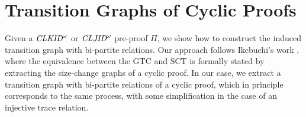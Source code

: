 \section{Transition Graphs of Cyclic Proofs}
\label{sec:transition-graph-proofs}

Given a $\textit{CLKID}^\omega$ or $\textit{CLJID}^\omega$ pre-proof $\Pi$, we show how to construct the induced transition graph with bi-partite relations. Our approach follows Ikebuchi's work \cite{Mirai}, where the equivalence between the GTC and SCT is formally stated by extracting the size-change graphs of a cyclic proof. In our case, we extract a transition graph with bi-partite relations of a cyclic proof, which in principle corresponds to the same process, with some simplification in the case of an injective trace relation.

